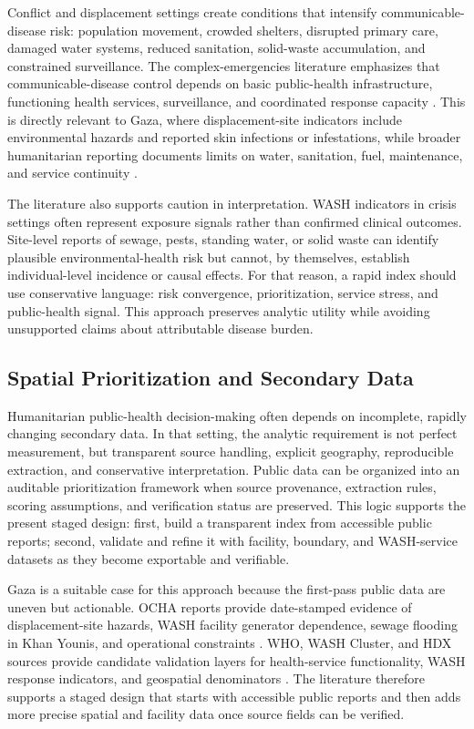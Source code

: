 Conflict and displacement settings create conditions that intensify communicable-disease risk: population movement, crowded shelters, disrupted primary care, damaged water systems, reduced sanitation, solid-waste accumulation, and constrained surveillance. The complex-emergencies literature emphasizes that communicable-disease control depends on basic public-health infrastructure, functioning health services, surveillance, and coordinated response capacity \citep{connolly_2004}. This is directly relevant to Gaza, where displacement-site indicators include environmental hazards and reported skin infections or infestations, while broader humanitarian reporting documents limits on water, sanitation, fuel, maintenance, and service continuity \citep{ocha_2026_apr17,ocha_2026_may15}.

The literature also supports caution in interpretation. WASH indicators in crisis settings often represent exposure signals rather than confirmed clinical outcomes. Site-level reports of sewage, pests, standing water, or solid waste can identify plausible environmental-health risk but cannot, by themselves, establish individual-level incidence or causal effects. For that reason, a rapid index should use conservative language: risk convergence, prioritization, service stress, and public-health signal. This approach preserves analytic utility while avoiding unsupported claims about attributable disease burden.

\subsection{Spatial Prioritization and Secondary Data}

Humanitarian public-health decision-making often depends on incomplete, rapidly changing secondary data. In that setting, the analytic requirement is not perfect measurement, but transparent source handling, explicit geography, reproducible extraction, and conservative interpretation. Public data can be organized into an auditable prioritization framework when source provenance, extraction rules, scoring assumptions, and verification status are preserved. This logic supports the present staged design: first, build a transparent index from accessible public reports; second, validate and refine it with facility, boundary, and WASH-service datasets as they become exportable and verifiable.

Gaza is a suitable case for this approach because the first-pass public data are uneven but actionable. OCHA reports provide date-stamped evidence of displacement-site hazards, WASH facility generator dependence, sewage flooding in Khan Younis, and operational constraints \citep{ocha_2026_apr17,ocha_2026_may15}. WHO, WASH Cluster, and HDX sources provide candidate validation layers for health-service functionality, WASH response indicators, and geospatial denominators \citep{who_emro_dashboards_2026,wash_cluster_palestine_2026,hdx_palestine_health_2026}. The literature therefore supports a staged design that starts with accessible public reports and then adds more precise spatial and facility data once source fields can be verified.

